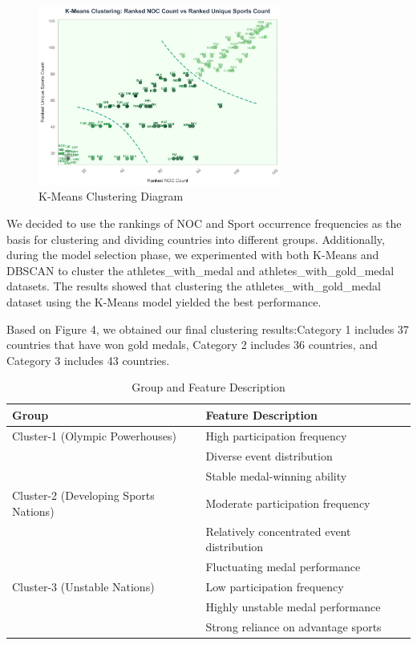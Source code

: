 \documentclass{mcmthesis}
\begin{document}
\begin{figure}[H]
    \centering
    \includegraphics[width=8cm]{graph/K-Means Clustering Redraw.png}
    \caption{K-Means Clustering Diagram} \label{Figure 4}
\end{figure}

We decided to use the rankings of NOC and Sport occurrence frequencies as the basis for clustering and dividing countries into different groups. Additionally, during the model selection phase, we experimented with both K-Means and DBSCAN to cluster the athletes\_with\_medal and athletes\_with\_gold\_medal datasets. The results showed that clustering the athletes\_with\_gold\_medal dataset using the K-Means model yielded the best performance.

Based on Figure 4, we obtained our final clustering results:Category 1 includes 37 countries that have won gold medals, Category 2 includes 36 countries, and Category 3 includes 43 countries.


\begin{table}[htbp]
    \centering
    \caption{Group and Feature Description}
    \begin{tabular}{@{}p{5cm}p{10cm}@{}}
        \toprule[2pt]
        \textbf{Group} & \textbf{Feature Description} \\
        \midrule[1pt]
        Cluster-1 (Olympic Powerhouses) & 
        High participation frequency \\
        & Diverse event distribution \\
        & Stable medal-winning ability \\
        \addlinespace
        Cluster-2 (Developing Sports Nations) & 
        Moderate participation frequency \\
        & Relatively concentrated event distribution \\
        & Fluctuating medal performance \\
        \addlinespace
        Cluster-3 (Unstable Nations) & 
        Low participation frequency \\
        & Highly unstable medal performance \\
        & Strong reliance on advantage sports \\
        \bottomrule[2pt]
    \end{tabular}
\end{table}
\end{document}
